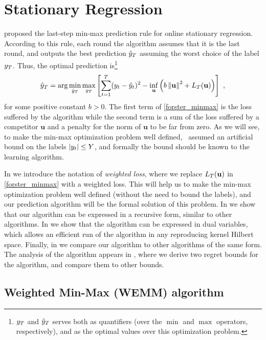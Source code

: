 \chapter{Stationary Regression}

\cite{Forster} proposed the last-step min-max prediction rule for online stationary regression.
According to this rule, each round the algorithm assumes that it is the last round,
and outputs the best prediction $\hat{y}_{T}$ assuming the worst choice of the label $y_{T}$.
Thus, the optimal prediction is\footnote{$y_{T}$ and $\hat{y}_{T}$ serves both as quantifiers (over the
 $\min$ and $\max$ operators, respectively), and as the optimal values
 over this optimization problem. }
\begin{align}
\hat{y}_{T} = \arg\min_{\hat{y}_{T}} \max_{y_{T}} \left[{\sum_{t=1}^{T} (y_{t} -
  \hat{y}_{t})^2  - \inf_{\mathbf{u}} \left({b\left\Vert \mathbf{u}\right\Vert
    ^{2}+L_{T}(\mathbf{u})}\right)}\right]~,
\label{forster_minmax}
\end{align}
for some positive constant $b>0$. The first term of \eqref{forster_minmax}
is the loss suffered by the algorithm while the second term is a sum of the loss suffered by a competitor $\mathbf{u}$ and a penalty for the norm of $\mathbf{u}$ to be far from zero.
As we will see, to make the min-max optimization problem well defined,~\cite{Forster} assumed
an artificial bound on the labels $|y_{t}|\leq Y$, and formally the bound should be known to the learning algorithm.

In  we introduce the notation of {\em weighted loss},
where we replace $L_{T}(\mathbf{u})$ in \eqref{forster_minmax} with a weighted loss.
This will help us to make the min-max optimization problem well defined (without the need to bound the labels), and
our prediction algorithm will be the formal solution of this problem.
In  we show that our algorithm can be expressed in a recursive form,
similar to other algorithms. In  we show that the algorithm can be expressed in dual variables, which allows an efficient run of the algorithm in any reproducing kernel Hilbert space.
Finally, in  we compare our algorithm to other algorithms of the same form.
The analysis of the algorithm appears in ,
where we derive two regret bounds for the algorithm, and compare them to other bounds.

\section{Weighted Min-Max (WEMM) algorithm}
\label{sec:WEMM_alg}

